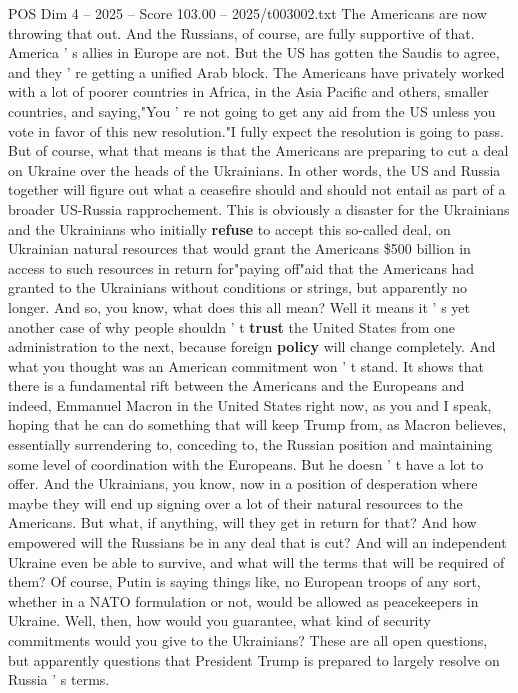 \begin{textsample}{POS Dim 4 – 2025 – Score 103.00 – 2025/t003002.txt}
The Americans are now throwing that out.
And the Russians, of course, are fully supportive of that.
America ' s allies in Europe are not.
But the US has gotten the Saudis to agree, and they ' re getting a unified Arab block.
The Americans have privately worked with a lot of poorer countries in Africa, in the Asia Pacific and others, smaller countries, and saying,"You ' re not going to get any aid from the US unless you vote in favor of this new resolution."I fully expect the resolution is going to pass.
But of course, what that means is that the Americans are preparing to cut a deal on Ukraine over the heads of the Ukrainians.
In other words, the US and Russia together will figure out what a ceasefire should and should not entail as part of a broader US-Russia rapprochement.
This is obviously a disaster for the Ukrainians and the Ukrainians who initially \textbf{refuse} to accept this so-called deal, on Ukrainian natural resources that would grant the Americans \$500 billion in access to such resources in return for"paying off"aid that the Americans had granted to the Ukrainians without conditions or strings, but apparently no longer.
And so, you know, what does this all mean?
Well it means it ' s yet another case of why people shouldn ' t \textbf{trust} the United States from one administration to the next, because foreign \textbf{policy} will change completely.
And what you thought was an American commitment won ' t stand.
It shows that there is a fundamental rift between the Americans and the Europeans and indeed, Emmanuel Macron in the United States right now, as you and I speak, hoping that he can do something that will keep Trump from, as Macron believes, essentially surrendering to, conceding to, the Russian position and maintaining some level of coordination with the Europeans.
But he doesn ' t have a lot to offer.
And the Ukrainians, you know, now in a position of desperation where maybe they will end up signing over a lot of their natural resources to the Americans.
But what, if anything, will they get in return for that?
And how empowered will the Russians be in any deal that is cut?
And will an independent Ukraine even be able to survive, and what will the terms that will be required of them?
Of course, Putin is saying things like, no European troops of any sort, whether in a NATO formulation or not, would be allowed as peacekeepers in Ukraine.
Well, then, how would you guarantee, what kind of security commitments would you give to the Ukrainians?
These are all open questions, but apparently questions that President Trump is prepared to largely resolve on Russia ' s terms.

\end{textsample}
